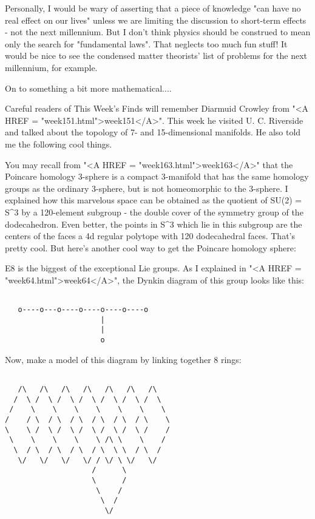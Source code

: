 Personally, I would be wary of asserting that a piece of knowledge
"can have no real effect on our lives" unless we are limiting
the discussion to short-term effects - not the next millennium.  But I
don't think physics should be construed to mean only the search for
"fundamental laws".  That neglects too much fun stuff!  It
would be nice to see the condensed matter theorists' list of problems
for the next millennium, for example.

On to something a bit more mathematical....

Careful readers of This Week's Finds will remember Diarmuid Crowley from
"<A HREF = "week151.html">week151</A>".  This week he visited
U. C. Riverside and talked about the topology of 7- and 15-dimensional
manifolds.  He also told me the following cool things.

You may recall from "<A HREF = "week163.html">week163</A>"
that the Poincare homology 3-sphere is a compact 3-manifold that has the
same homology groups as the ordinary 3-sphere, but is not homeomorphic
to the 3-sphere.  I explained how this marvelous space can be obtained
as the quotient of SU(2) = S^{3} by a 120-element subgroup - the double
cover of the symmetry group of the dodecahedron.  Even better, the
points in S^{3} which lie in this subgroup are the centers of the faces a
4d regular polytope with 120 dodecahedral faces.  That's pretty cool.
But here's another cool way to get the Poincare homology sphere:

E8 is the biggest of the exceptional Lie groups.  As I explained in
"<A HREF = "week64.html">week64</A>", the Dynkin diagram of
this group looks like this:



\begin{verbatim}

   o----o---o----o----o----o----o
                      |
                      |
                      o
\end{verbatim}
    
Now, make a model of this diagram by linking together 8 rings:


\begin{verbatim}

   /\   /\   /\   /\   /\   /\   /\ 
  /  \ /  \ /  \ /  \ /  \ /  \ /  \
 /    \    \    \    \    \    \    \
/    / \  / \  / \  / \  / \  / \    \ 
\    \ /  \ /  \ /  \ /  \ /  \ /    / 
 \    \    \    \    \ /\ \    \    /
  \  / \  / \  / \  / \  \ \  / \  /
   \/   \/   \/   \/ / \/ \ \/   \/
                    /      \ 
                    \      /
                     \    /
                      \  /
                       \/ 
\end{verbatim}
    
